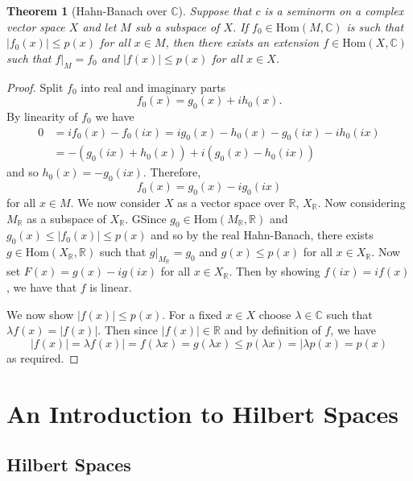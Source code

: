 \documentclass[justified]{tufte-book}
\theoremstyle{plain}%
\newtheorem{thm}{Theorem}[chapter]
\theoremstyle{definition}
\theoremstyle{remark}
\newcommand{\R}{\mathbb{R}}
\renewcommand{\C}{\mathbb{C}}
\begin{document}
\begin{thm}[Hahn-Banach over $\C$]
  Suppose that $c$ is a seminorm on a complex vector space $X$ and let $M$ sub a subspace of $X$.  If $f_0 \in \text{Hom}(M, \C)$ is such that $|f_0(x) | \leq p(x)$ for all $x \in M$, then there exists an extension $f \in \text{Hom}(X, \C)$ such that $f|_M = f_0$ and $|f(x)| \leq p(x)$ for all $x \in X$.  
\end{thm} 

\begin{proof}
  Split $f_0$ into real and imaginary parts \[
      f_0(x) = g_0(x) + ih_0(x).
  \]  By linearity of $f_0$ we have \begin{align*}
      0   &= if_0(x) - f_0(ix) = ig_0(x) - h_0(x) - g_0(ix) - ih_0(ix) \\
          &= -(g_0(ix) + h_0(x) ) + i(g_0(x) - h_0(ix))
  \end{align*} and so $h_0(x) = -g_0(ix)$.  Therefore, \[
      f_0(x) = g_0(x) - ig_0(ix)
  \] 
  for all $x \in M$.  We now consider $X$ as a vector space over $\R$, $X_\R$.  Now considering $M_\R$ as a subspace of $X_\R$.  GSince $g_0 \in \text{Hom}(M_\R, \R)$ and $g_0(x) \leq |f_0(x)| \leq p(x)$ and so by the real Hahn-Banach, there exists $g \in \text{Hom}(X_\R, \R)$ such that $g|_{M_\R} = g_0$ and $g(x) \leq p(x)$ for all $x \in X_\R$.  Now set $F(x) = g(x) - ig(ix)$ for all $x \in X_\R$.  Then by showing $f(ix) = if(x)$, we have that $f$ is linear.  
  
  We now show $|f(x)| \leq p(x)$.  For a fixed $x \in X$ choose $\lambda \in \C$ such that $\lambda f(x) = |f(x)|$.  Then since $|f(x)| \in \R$ and by definition of $f$, we have \[
      |f(x)| = \lambda f(x) | = f(\lambda x) = g(\lambda x) \leq p(\lambda x) = |\lambda p(x) = p(x)
  \] as required.  
 \end{proof}

\chapter{An Introduction to Hilbert Spaces}


\section{Hilbert Spaces}
\end{document}
